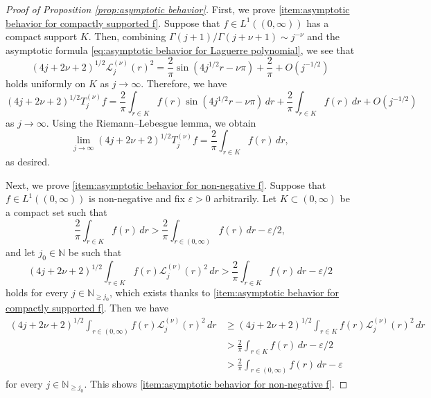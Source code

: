 \documentclass[reqno]{amsart}
\theoremstyle{plain}
\numberwithin{equation}{section}
\theoremstyle{remark}
\newcommand{\N}{\mathbb{N}}
\newcommand{\intervaloo}[2]{(#1, #2)}
\newcommand{\Tjnuf}[3]{T_{#1}^{(#2)}#3}
\newcommand{\LaguerrecalLjnu}[2]{\mathcal{L}_{#1}^{(#2)}}
\begin{document}
\begin{proof}[Proof of Proposition \ref{prop:asymptotic behavior}]
	First, we prove \ref{item:asymptotic behavior for compactly supported f}. 
	Suppose that $f \in L^1(\intervaloo{0}{\infty})$ has a compact support $K$.
Then, combining $\Gamma(j+1)/\Gamma(j+\nu+1) \sim j^{-\nu}$ and the asymptotic formula \eqref{eq:asymptotic behavior for Laguerre polynomial}, we see that
	\begin{equation} \label{eq:asymptotic behavior for Laguerre function}
	(4j+2\nu+2)^{1/2} \LaguerrecalLjnu{j}{\nu}(r)^2 = \frac{2}{\pi} \sin{(4j^{1/2} r -\nu\pi)} + \frac{2}{\pi} + O(j^{-1/2})
\end{equation}
holds uniformly on $K$ as $j \to \infty$. Therefore, we have
\begin{equation}
(4j+2\nu+2)^{1/2} \Tjnuf{j}{\nu}{f} = \frac{2}{\pi} \int_{r \in K} f(r) \sin{(4j^{1/2} r -\nu\pi)} \, dr + \frac{2}{\pi} \int_{r \in K} f(r) \, dr + O(j^{-1/2})
\end{equation}
as $j \to \infty$.
Using the Riemann--Lebesgue lemma, we obtain
\begin{equation}
\lim_{j \to \infty} (4j+2\nu+2)^{1/2} \Tjnuf{j}{\nu}{f} = \frac{2}{\pi} \int_{r \in K} f(r) \, dr ,
\end{equation}
as desired. 

Next, we prove \ref{item:asymptotic behavior for non-negative f}. 
Suppose that $f \in L^1(\intervaloo{0}{\infty})$ is non-negative and
fix $\varepsilon > 0$ arbitrarily. 
Let $K \subset \intervaloo{0}{\infty}$ be a compact set such that
\begin{equation}
\frac{2}{\pi} \int_{r \in K} f(r) \, dr > \frac{2}{\pi} \int_{r \in \intervaloo{0}{\infty}} f(r) \, dr - \varepsilon / 2 ,
\end{equation}
and let $j_0 \in \N$ be such that 
\begin{equation}
(4j+2\nu+2)^{1/2} \int_{r \in K} f(r) \LaguerrecalLjnu{j}{\nu}(r)^2 \, dr > \frac{2}{\pi} \int_{r \in K} f(r) \, dr - \varepsilon / 2
\end{equation}
holds for every $j \in \N_{\geq j_0}$, which exists thanks to \ref{item:asymptotic behavior for compactly supported f}.
Then we have
\begin{align}
(4j+2\nu+2)^{1/2} \int_{r \in \intervaloo{0}{\infty}} f(r) \LaguerrecalLjnu{j}{\nu}(r)^2 \, dr
&\geq (4j+2\nu+2)^{1/2} \int_{r \in K} f(r) \LaguerrecalLjnu{j}{\nu}(r)^2 \, dr \\
&> \frac{2}{\pi} \int_{r \in K} f(r) \, dr - \varepsilon / 2  \\
&> \frac{2}{\pi} \int_{r \in \intervaloo{0}{\infty}} f(r) \, dr - \varepsilon
\end{align}
for every $j \in \N_{\geq j_0}$. This shows \ref{item:asymptotic behavior for non-negative f}.
\end{proof}
\end{document}
